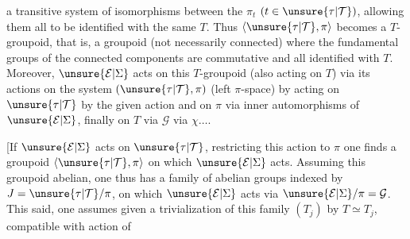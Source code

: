 a transitive system of isomorphisms between the $\pi_t$ $(t\in\unsure{\tau|\mathcal T})$, allowing them all to be identified with the same $T$. Thus $\langle\unsure{\tau|\mathcal T},\pi\rangle$ becomes a $T$-groupoid, that is, a groupoid (not necessarily connected) where the fundamental groups of the connected components are commutative and all identified with $T$.
Moreover, $\unsure{\mathcal E|\Sigma}$ acts on this $T$-groupoid (also acting on $T$) via its actions on the system $(\unsure{\tau|\mathcal T},\pi)$ (left $\pi$-space) by acting on $\unsure{\tau|\mathcal T}$ by the given action and on $\pi$ via inner automorphisms of $\unsure{\mathcal E|\Sigma}$, finally on $T$ via $\mathcal G$ via $\chi\ldots.$

[If $\unsure{\mathcal E|\Sigma}$ acts on $\unsure{\tau|\mathcal T}$, restricting this action to $\pi$ one finds a groupoid $\langle\unsure{\tau|\mathcal T},\pi\rangle$ on which $\unsure{\mathcal E|\Sigma}$ acts. Assuming this groupoid abelian, one thus has a family of abelian groups  indexed by $J=\unsure{\tau|\mathcal T}/\pi$, on which $\unsure{\mathcal E|\Sigma}$ acts via $\unsure{\mathcal E|\Sigma}/\pi=\mathcal G$. This said, one assumes given a trivialization of this family $(T_j)$ by $T\simeq T_j$, compatible with action of
